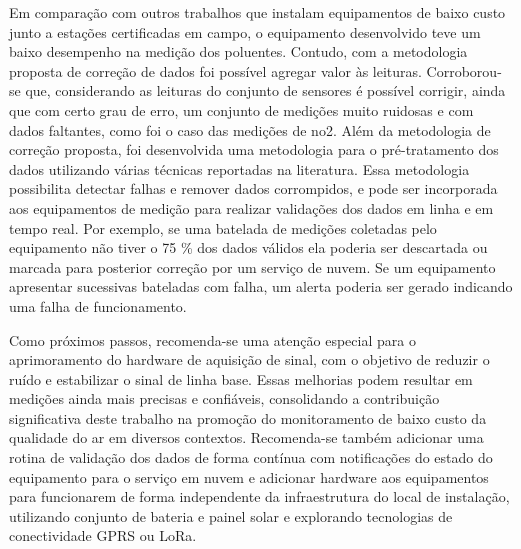 Em comparação com outros trabalhos que instalam equipamentos de baixo custo junto a estações certificadas em campo, o equipamento desenvolvido teve um baixo desempenho na medição dos poluentes. Contudo, com a metodologia proposta de correção de dados foi possível agregar valor às leituras. Corroborou-se que, considerando as leituras do conjunto de sensores é possível corrigir, ainda que com certo grau de erro, um conjunto de medições muito ruidosas e com dados faltantes, como foi o caso das medições de \acrshort{no2}. Além da metodologia de correção proposta, foi desenvolvida uma metodologia para o pré-tratamento dos dados utilizando várias técnicas reportadas na literatura. Essa metodologia possibilita detectar falhas e remover dados corrompidos, e pode ser incorporada aos equipamentos de medição para realizar validações dos dados em linha e em tempo real. Por exemplo, se uma batelada de medições coletadas pelo equipamento não tiver o 75 \% dos dados válidos ela poderia ser descartada ou marcada para posterior correção por um serviço de nuvem. Se um equipamento apresentar sucessivas bateladas com falha, um alerta poderia ser gerado indicando uma falha de funcionamento.

Como próximos passos, recomenda-se uma atenção especial para o aprimoramento do hardware de aquisição de sinal, com o objetivo de reduzir o ruído e estabilizar o sinal de linha base. Essas melhorias podem resultar em medições ainda mais precisas e confiáveis, consolidando a contribuição significativa deste trabalho na promoção do monitoramento de baixo custo da qualidade do ar em diversos contextos. Recomenda-se também adicionar uma rotina de validação dos dados de forma contínua com notificações do estado do equipamento para o serviço em nuvem e adicionar hardware aos equipamentos para funcionarem de forma independente da infraestrutura do local de instalação, utilizando conjunto de bateria e painel solar e explorando tecnologias de conectividade GPRS ou LoRa.